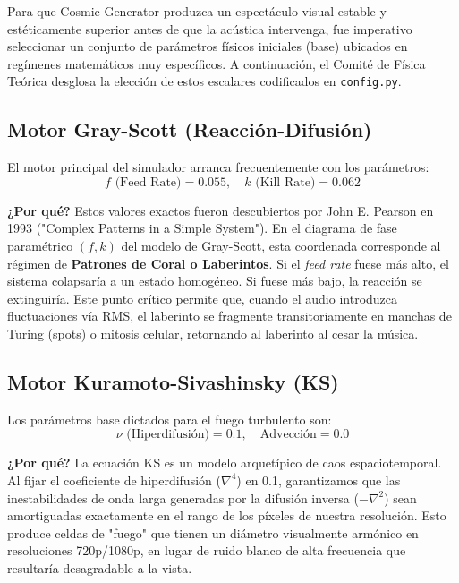 \documentclass[12pt, openany]{book}
\begin{document}
Para que Cosmic-Generator produzca un espectáculo visual estable y estéticamente superior antes de que la acústica intervenga, fue imperativo seleccionar un conjunto de parámetros físicos iniciales (base) ubicados en regímenes matemáticos muy específicos. A continuación, el Comité de Física Teórica desglosa la elección de estos escalares codificados en \texttt{config.py}.

\subsection{Motor Gray-Scott (Reacción-Difusión)}
El motor principal del simulador arranca frecuentemente con los parámetros:
\begin{equation}
f \text{ (Feed Rate)} = 0.055, \quad k \text{ (Kill Rate)} = 0.062
\end{equation}

\textbf{¿Por qué?} Estos valores exactos fueron descubiertos por John E. Pearson en 1993 ("Complex Patterns in a Simple System"). En el diagrama de fase paramétrico $(f, k)$ del modelo de Gray-Scott, esta coordenada corresponde al régimen de \textbf{Patrones de Coral o Laberintos}. 
Si el \textit{feed rate} fuese más alto, el sistema colapsaría a un estado homogéneo. Si fuese más bajo, la reacción se extinguiría. Este punto crítico permite que, cuando el audio introduzca fluctuaciones vía RMS, el laberinto se fragmente transitoriamente en manchas de Turing (spots) o mitosis celular, retornando al laberinto al cesar la música.

\subsection{Motor Kuramoto-Sivashinsky (KS)}
Los parámetros base dictados para el fuego turbulento son:
\begin{equation}
\nu \text{ (Hiperdifusión)} = 0.1, \quad \text{Advección} = 0.0
\end{equation}

\textbf{¿Por qué?} La ecuación KS es un modelo arquetípico de caos espaciotemporal. Al fijar el coeficiente de hiperdifusión ($\nabla^4$) en 0.1, garantizamos que las inestabilidades de onda larga generadas por la difusión inversa ($-\nabla^2$) sean amortiguadas exactamente en el rango de los píxeles de nuestra resolución. Esto produce celdas de "fuego" que tienen un diámetro visualmente armónico en resoluciones 720p/1080p, en lugar de ruido blanco de alta frecuencia que resultaría desagradable a la vista.
\end{document}
